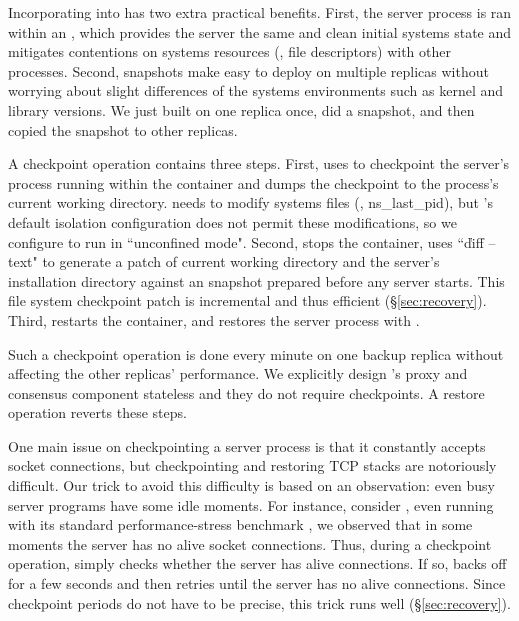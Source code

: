 Incorporating \lxc into \xxx has two extra practical benefits. First, the 
server process is ran within an \lxc, which provides the server the same 
and clean initial systems state and mitigates contentions on systems resources
(\eg, file descriptors) with other processes. Second, \lxc snapshots make \xxx 
easy to deploy on multiple replicas without worrying about slight differences of 
the systems environments such as kernel and library versions. We just built \xxx 
on one replica once, did a \lxc snapshot, and then copied the snapshot to 
other replicas.

A \xxx checkpoint operation contains three steps. First, \xxx 
uses \criu to checkpoint the server's process running within the \lxc 
container and dumps the checkpoint to the process's current working directory. 
\criu needs to modify systems files (\eg, ns\_last\_pid), but \lxc's 
default isolation configuration does not permit these modifications, so we 
configure \lxc to run in ``unconfined mode". Second, \xxx stops the container, 
uses ``\v{diff --text}" to generate a patch of current working directory and 
the server's installation directory against an \lxc snapshot prepared before 
any server starts. This file system checkpoint patch is incremental and 
thus efficient (\S\ref{sec:recovery}). Third, \xxx restarts the container, and 
restores the server process with \criu.

Such a \xxx checkpoint operation is done every minute on one 
backup replica without affecting the other replicas' performance. We 
explicitly design \xxx's proxy and consensus component stateless and they do not 
require checkpoints. A \xxx restore operation reverts these steps.

One main issue on checkpointing a server process is that it constantly accepts 
socket connections, but checkpointing and restoring 
TCP stacks are notoriously difficult. Our trick to avoid this difficulty is 
based on an observation: even busy server programs have some idle moments. For 
instance, consider \apache, even running with its standard performance-stress 
benchmark \ab, we observed that in some moments the server has no alive socket 
connections. Thus, during a checkpoint operation, \xxx simply checks whether the 
server has alive connections. If so, \xxx backs off for a few seconds and then 
retries until the server has no alive connections. Since checkpoint periods do 
not have to be precise, this trick runs well (\S\ref{sec:recovery}). 